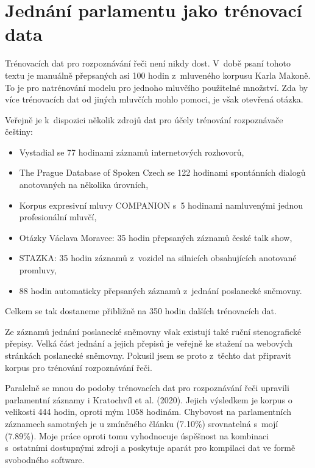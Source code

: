 \chapter{Jednání parlamentu jako trénovací data}
\label{kap:svolocz}

Trénovacích dat pro rozpoznávání řeči není nikdy dost. V~době psaní tohoto textu
je manuálně přepsaných asi 100 hodin z~mluveného korpusu Karla Makoně. To je pro
natrénování modelu pro jednoho mluvčího použitelné množství. Zda by více
trénovacích dat od jiných mluvčích mohlo pomoci, je však otevřená otázka.

Veřejně je k~dispozici několik zdrojů dat pro účely trénování
rozpoznávače češtiny:
\begin{itemize}
\item{
    Vystadial\cite{vystadialarticle} se 77 hodinami záznamů internetových
    rozhovorů\cite{vystadialdata},
}
\item{
    The Prague Database of Spoken Czech\cite{pdtscarticle} se 122 hodinami
    spontánních dialogů anotovaných na několika úrovních\cite{pdtscdata},
}
\item{
    Korpus expresivní mluvy COMPANION s~5 hodinami namluvenými jednou
    profesionální mluvčí\cite{companiondata},
}
\item{
    Otázky Václava Moravce: 35 hodin přepsaných záznamů české talk
    show\cite{ovmdata},
}
\item{
    STAZKA: 35 hodin záznamů z~vozidel na silnicích obsahujících anotované
    promluvy\cite{stazkadata},
}
\item{
    88 hodin automaticky přepsaných záznamů z~jednání poslanecké
    sněmovny\cite{pspdata}.
}
\end{itemize}
Celkem se tak dostaneme přibližně na 350 hodin dalších trénovacích dat.

Ze záznamů jednání poslanecké sněmovny však existují také ruční stenografické
přepisy. Velká část jednání a jejich přepisů je veřejně ke stažení na webových
stránkách poslanecké sněmovny. Pokusil jsem se proto z~těchto dat připravit
korpus pro trénování rozpoznávání řeči.

Paralelně se mnou do podoby trénovacích
dat pro rozpoznávání řeči upravili parlamentní záznamy i Kratochvíl et al.
(2020)\cite{kratochvil2020large}. Jejich výsledkem je korpus o velikosti 444
hodin, oproti mým 1058 hodinám. Chybovost na parlamentních záznamech samotných
je u zmíněného článku (7.10\%) srovnatelná s~mojí (7.89\%).
Moje práce oproti tomu vyhodnocuje úspěšnost na kombinaci s~ostatními dostupnými
zdroji a poskytuje aparát pro kompilaci dat ve formě svobodného software.

